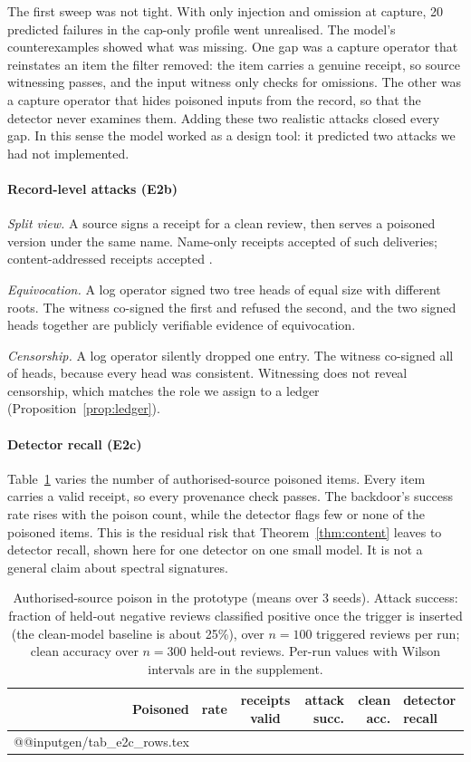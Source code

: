 The first sweep was not tight. With only injection and omission at capture, 20 predicted
failures in the cap-only profile went unrealised. The model's counterexamples showed what
was missing. One gap was a capture operator that reinstates an item the filter removed:
the item carries a genuine receipt, so source witnessing passes, and the input witness only
checks for omissions. The other was a capture operator that hides poisoned inputs from the
record, so that the detector never examines them. Adding these two realistic attacks closed
every gap. In this sense the model worked as a design tool: it predicted two attacks we had
not implemented.

\paragraph{Record-level attacks (E2b)}
\emph{Split view.} A source signs a receipt for a clean review, then serves a poisoned
version under the same name. Name-only receipts accepted \SVname{} of \SVtrials{} such
deliveries; content-addressed receipts accepted \SVcontent{}.

\emph{Equivocation.} A log operator signed two tree heads of equal size with different roots.
The witness co-signed the first and refused the second, and the two signed heads together
are publicly verifiable evidence of equivocation.

\emph{Censorship.} A log operator silently dropped one entry. The witness co-signed all
\CENcos{} of \CENheads{} heads, because every head was consistent. Witnessing does not
reveal censorship, which matches the role we assign to a ledger
(Proposition~\ref{prop:ledger}).

\paragraph{Detector recall (E2c)}
Table~\ref{tab:e2c} varies the number of authorised-source poisoned items. Every item
carries a valid receipt, so every provenance check passes. The backdoor's success rate
rises with the poison count, while the detector flags few or none of the poisoned items. This
is the residual risk that Theorem~\ref{thm:content} leaves to detector recall, shown here
for one detector on one small model. It is not a general claim about spectral signatures.

\begin{table}[t]
\centering\scriptsize
\caption{Authorised-source poison in the prototype (means over 3 seeds). Attack success:
fraction of held-out negative reviews classified positive once the trigger is inserted
(the clean-model baseline is about 25\%), over $n=100$ triggered reviews per run; clean
accuracy over $n=300$ held-out reviews. Per-run values with Wilson intervals are in the
supplement.}\label{tab:e2c}
\begin{tabular}{@{}rrcrrl@{}}
\toprule
Poisoned & rate & receipts valid & attack succ. & clean acc. & detector recall\\
\midrule
\csname @@input\endcsname gen/tab_e2c_rows.tex 
\bottomrule
\end{tabular}
\end{table}

